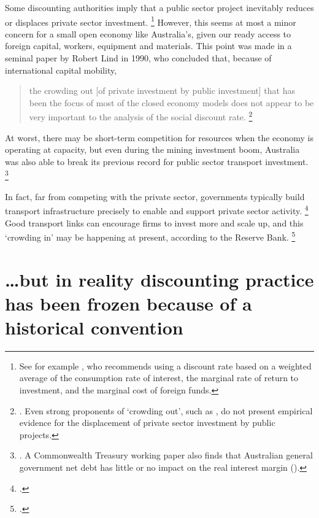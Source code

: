 \documentclass{grattan}
\begin{document}
Some discounting authorities imply that a public sector project inevitably reduces or displaces private sector investment.%
    \footnote{See for example \textcite{Harrison-Valuing-the-Future}, who recommends using a discount rate based on a weighted average of the consumption rate of interest, the marginal rate of return to investment, and the marginal cost of foreign funds.}
However, this seems at most a minor concern for a small open economy like Australia’s, given our ready access to foreign capital, workers, equipment and materials. This point was made in a seminal paper by Robert Lind in 1990, who concluded that, because of international capital mobility, 
\begin{quote}\small the crowding out [of private investment by public investment] that has been the focus of most of the closed economy models does not appear to be very important to the analysis of the social discount rate.%
    \footnote{\textcite[][S-16]{Lind-1990-Reassessing-the-governments-discount-rate}. Even strong proponents of `crowding out', such as \textcite{Harrison-Valuing-the-Future}, do not present empirical evidence for the displacement of private sector investment by public projects.}
\end{quote}

At worst, there may be short-term competition for resources when the economy is operating at capacity, but even during the mining investment boom, Australia was also able to break its previous record for public sector transport investment.%
    \footnote{\textcites{Tulip-2014-RBA-Bulletin-The-effect-of-the-mining-boom}{Terrill_2016}. A Commonwealth Treasury working paper also finds that Australian general government net debt has little or no impact on the real interest margin (\textcite{treasury2010link-between-fiscal-policy-and-interest-rates}).}

In fact, far from competing with the private sector, governments typically build transport infrastructure precisely to enable and support private sector activity.%
    \footcite{Venables-2017-incorporating-WEBs-into-transport-cba}
Good transport links can encourage firms to invest more and scale up, and this `crowding in' may be happening at present, according to the Reserve Bank.%
    \footcite{Minutes-of-RBA-Board-meeting-5-December-2017}


\section{\dots{}but in reality discounting practice has been frozen because of a historical convention}\label{subsec:discounting-practice-relies-on-historical-convention}
\end{document}
